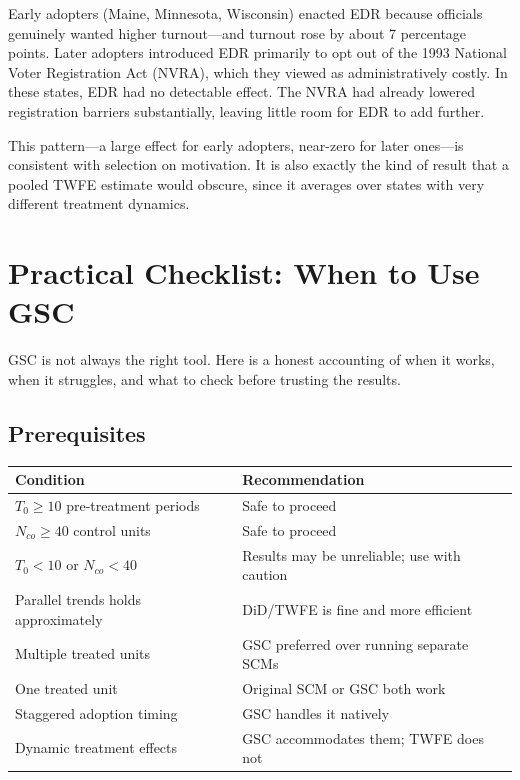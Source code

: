 \documentclass[12pt]{article}
\begin{document}
Early adopters (Maine, Minnesota, Wisconsin) enacted EDR because officials genuinely
wanted higher turnout---and turnout rose by about 7 percentage points.
Later adopters introduced EDR primarily to opt out of the 1993 National Voter
Registration Act (NVRA), which they viewed as administratively costly.
In these states, EDR had no detectable effect.
The NVRA had already lowered registration barriers substantially,
leaving little room for EDR to add further.

This pattern---a large effect for early adopters, near-zero for later ones---is
consistent with selection on motivation.
It is also exactly the kind of result that a pooled TWFE estimate would obscure,
since it averages over states with very different treatment dynamics.

\section{Practical Checklist: When to Use GSC}

GSC is not always the right tool.
Here is a honest accounting of when it works, when it struggles,
and what to check before trusting the results.

\subsection{Prerequisites}

\begin{center}
\begin{tabular}{p{5.5cm}p{7.5cm}}
  \toprule
  Condition & Recommendation \\
  \midrule
  $T_0 \geq 10$ pre-treatment periods & Safe to proceed \\
  $N_{co} \geq 40$ control units & Safe to proceed \\
  $T_0 < 10$ or $N_{co} < 40$ & Results may be unreliable; use with caution \\
  Parallel trends holds approximately & DiD/TWFE is fine and more efficient \\
  Multiple treated units & GSC preferred over running separate SCMs \\
  One treated unit & Original SCM or GSC both work \\
  Staggered adoption timing & GSC handles it natively \\
  Dynamic treatment effects & GSC accommodates them; TWFE does not \\
  \bottomrule
\end{tabular}
\end{center}
\end{document}
